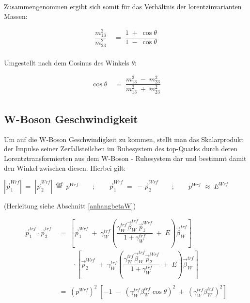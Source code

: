 \documentclass[
a4paper,                                %
twoside,                                %
BCOR1.4cm,                      %
ngerman,                                %
10pt,                           %
headings=normal,                %
headsepline,                    %
clearplainpage, %
final,                                  %
div=14,
parskip=full
]{scrbook}
\begin{document}
Zusammengenommen ergibt sich somit f\"ur das Verh\"altnis der lorentzinvarianten Massen:

\begin{align}
	\dfrac{m_{1 3}^{2}}{m_{2 3}^{2}}
\;&=\;
	\dfrac{1\;+\;\cos \theta}{1\;-\;\cos \theta}
\label{m13m23}
\\
\nonumber
\end{align}

Umgestellt nach dem Cosinus des Winkels $ \theta $:

\begin{align}
	\cos \theta
\;&=\;
	\dfrac{m_{1 3}^{2}\;-\;m_{2 3}^{2}}{m_{1 3}^{2}\;+\;m_{2 3}^{2}}
\label{costheta}
\\
\nonumber
\end{align}

\subsection{W-Boson Geschwindigkeit}

Um auf die W-Boson Geschwindigkeit zu kommen, stellt man das Skalarprodukt der Impulse seiner Zerfallsteilchen im Ruhesystem des top-Quarks durch deren Lorentztransformierten aus dem W-Boson - Ruhesystem dar und bestimmt damit den Winkel zwischen diesen. Hierbei gilt:

$ |\vec{p}_{1}^{Wrf}|\;=\;|\vec{p}_{2}^{Wrf}|
\;\stackrel{\mathrm{def}}=\;p^{Wrf}\qquad ; \qquad \vec{p}_{1}^{Wrf}\;=\;-\vec{p}_{2}^{Wrf} 
\qquad ; \qquad p^{Wrf}\;\approx\;E^{Wrf} $

(Herleitung siehe Abschnitt \ref{anhangbetaW})

\begin{align}
	\vec{p}_{1}^{trf} \cdot \vec{p}_{2}^{trf}
\;&=\;
	\left[
		\vec{p}_{1}^{Wrf}\;+\;\gamma_{W}^{trf} 
		\left(
			\dfrac{\gamma_{W}^{trf} \vec{\beta}_{W}^{trf}\vec{p}_{1}^{Wrf}}
			{1+\gamma_{W}^{trf}}\;+\;E
		\right) \vec{\beta}_{W}^{trf}
	\right] 
\nonumber
\\	
&\qquad\cdot
	\left[
		\vec{p}_{2}^{Wrf}\;+\;\gamma_{W}^{trf} 
		\left(
			\dfrac{\gamma_{W}^{trf} \vec{\beta}_{W}^{trf}\vec{p}_{2}^{Wrf}}
			{1+\gamma_{W}^{trf}}\;+\;E
		\right) \vec{\beta}_{W}^{trf}
	\right]
\nonumber
\\
\nonumber
\\
\;&=\;
	\left(p^{Wrf}\right)^{2}\;
	\left[ 
		-1\;-\;\left( \gamma_{W}^{trf} \beta_{W}^{trf} \cos \theta \right)^{2}
		\;+\;\left( \gamma_{W}^{trf} \beta_{W}^{trf} \right)^{2} 
	\right]
	\label{skalp1p2}
\\
\nonumber
\end{align}
\end{document}
